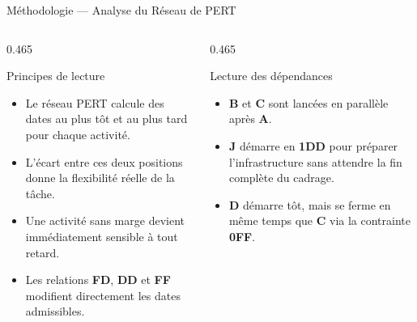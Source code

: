 \begin{frame}{Méthodologie --- Analyse du Réseau de PERT}
    \scriptsize
    \setlength{\columnsep}{0.75cm}
    \begin{columns}[T,onlytextwidth]
        \begin{column}{0.465\textwidth}
            \begin{block}{Principes de lecture}
                \begin{itemize}
                    \item Le réseau PERT calcule des dates au plus tôt et au plus tard pour chaque activité.
                    \item L'écart entre ces deux positions donne la flexibilité réelle de la tâche.
                    \item Une activité sans marge devient immédiatement sensible à tout retard.
                    \item Les relations \textbf{FD}, \textbf{DD} et \textbf{FF} modifient directement les dates admissibles.
                \end{itemize}
            \end{block}
        \end{column}
        \begin{column}{0.465\textwidth}
            \begin{block}{Lecture des dépendances}
                \begin{itemize}
                    \item \textbf{B} et \textbf{C} sont lancées en parallèle après \textbf{A}.
                    \item \textbf{J} démarre en \textbf{1DD} pour préparer l'infrastructure sans attendre la fin complète du cadrage.
                    \item \textbf{D} démarre tôt, mais se ferme en même temps que \textbf{C} via la contrainte \textbf{0FF}.
                \end{itemize}
            \end{block}
        \end{column}
    \end{columns}
\end{frame}

